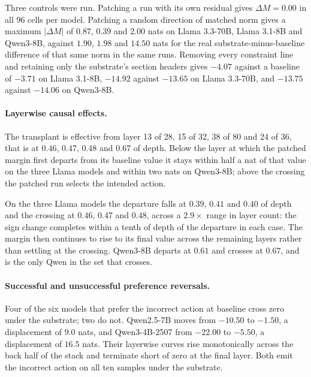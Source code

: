Three controls were run. Patching a run with its own residual gives $\Delta M =
0.00$ in all 96 cells per model. Patching a random direction of matched norm gives a
maximum $|\Delta M|$ of $0.87$, $0.39$ and $2.00$ nats on Llama 3.3-70B,
Llama 3.1-8B and Qwen3-8B, against $1.90$, $1.98$ and $14.50$ nats for the real
substrate-minus-baseline difference of that same norm in the same runs. Removing every constraint line and retaining
only the substrate's section headers gives $-4.07$ against a baseline of $-3.71$ on
Llama 3.1-8B, $-14.92$ against $-13.65$ on Llama 3.3-70B, and $-13.75$ against
$-14.06$ on Qwen3-8B.

\paragraph{Layerwise causal effects.}
The transplant is effective from layer 13 of 28, 15 of 32, 38 of 80 and 24 of 36,
that is at $0.46$, $0.47$, $0.48$ and $0.67$ of depth. Below the layer at which the
patched margin first departs from its baseline value it stays within half a nat of
that value on the three Llama models and within two nats on Qwen3-8B; above the
crossing the patched run selects the intended action.

On the three Llama models the departure falls at $0.39$, $0.41$ and $0.40$ of depth
and the crossing at $0.46$, $0.47$ and $0.48$, across a $2.9\times$ range in layer
count: the sign change completes within a tenth of depth of the departure in each
case. The margin then continues to rise to its final value across the remaining
layers rather than settling at the crossing. Qwen3-8B departs at $0.61$ and crosses
at $0.67$, and is the only Qwen in the set that crosses.

\paragraph{Successful and unsuccessful preference reversals.}
Four of the six models that prefer the incorrect action at baseline cross zero under
the substrate; two do not. Qwen2.5-7B moves from $-10.50$ to $-1.50$, a displacement
of $9.0$ nats, and Qwen3-4B-2507 from $-22.00$ to $-5.50$, a displacement of $16.5$
nats. Their layerwise curves rise monotonically across the back half of the stack
and terminate short of zero at the final layer. Both emit the incorrect action on
all ten samples under the substrate.

